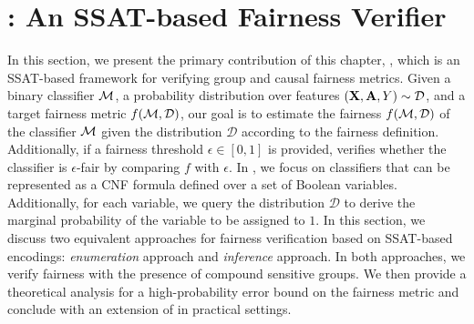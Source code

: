 \section{{\justicia}: An SSAT-based Fairness Verifier}
\label{fairness_justicia_sec:framework}
In this section, we present the primary contribution of this chapter, {\justicia}, which is an SSAT-based framework for verifying group and causal fairness metrics. Given a binary classifier $\alg$, a probability distribution over features $(\mathbf{X},\mathbf{A},Y) \sim \mathcal{D} $, and a target fairness metric $ f(\mathcal{M}, \mathcal{D}) $, our goal is to estimate the fairness $ f(\mathcal{M}, \mathcal{D}) $ of the classifier $ \alg $ given the distribution $ \mathcal{D} $ according to the fairness definition. Additionally, if a fairness threshold $ \epsilon \in [0,1] $ is provided, {\justicia} verifies whether the classifier is $ \epsilon $-fair by comparing $ f $ with $ \epsilon $. In {\justicia}, we focus on classifiers that can be represented as a CNF formula defined over a set of Boolean variables. Additionally, for each variable, we query the distribution $ \mathcal{D} $ to derive the marginal probability of the variable to be assigned to $ 1 $. In this section, we discuss two equivalent approaches for fairness verification based on SSAT-based encodings: \emph{enumeration} approach and \emph{inference} approach. In both approaches, we verify fairness with the presence of compound sensitive groups.  We then provide a theoretical analysis for a high-probability error bound on the fairness metric and conclude with an extension of {\justicia} in practical settings.




\iffalse
In this section, we present the main contribution of this paper, {\justicia}, which is an SSAT framework for verifying independence and separation metrics of fairness. 
We first state the problem formally in Section~\ref{fairness_justicia_sec:problem_statement}. 
To verify fairness metrics in compound sensitive groups, we discuss an enumeration approach in Section~\ref{fairness_justicia_sec:enumeration_ssat} and an equivalent but more efficient learning approach in Section~\ref{fairness_justicia_sec:learn_ssat}. 
We conclude this section by proposing a conditional distribution based enumeration for compound sensitive groups in Section~\ref{fairness_justicia_sec:cond_ssat}. 


\subsection{Problem Statement}
\label{fairness_justicia_sec:problem_statement}
Given a binary classifier $\alg$ and a probability distribution over dataset $(X,A,Y) \sim \mathcal{D} $, our goal is to verify whether $\alg$ achieves independence and separation metrics with respect to the distribution $\mathcal{D}$. We  focus on a classifier that can be translated to a CNF formula of Boolean variables $\mathbf{B} $. 
The probability $ p_i $ of $\bool_i \in \mathbf{B}$ being assigned to $1$ is induced by the data generating distribution $\mathcal{D}$. 
In our contribution, we reduce the verification problem to solving appropriately designed SSAT instances.
\fi 


